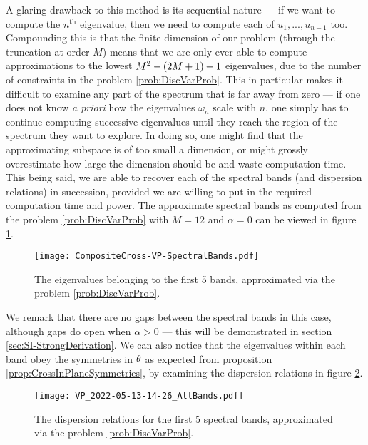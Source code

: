 A glaring drawback to this method is its sequential nature --- if we want to compute the $n^{\text{th}}$ eigenvalue, then we need to compute each of $u_1,...,u_{n-1}$ too.
Compounding this is that the finite dimension of our problem (through the truncation at order $M$) means that we are only ever able to compute approximations to the lowest $M^2 - \left( 2M + 1 \right) + 1$ eigenvalues, due to the number of constraints in the problem \ref{prob:DiscVarProb}.
This in particular makes it difficult to examine any part of the spectrum that is far away from zero --- if one does not know \emph{a priori} how the eigenvalues $\omega_n$ scale with $n$, one simply has to continue computing successive eigenvalues until they reach the region of the spectrum they want to explore.
In doing so, one might find that the approximating subspace is of too small a dimension, or might grossly overestimate how large the dimension should be and waste computation time.
This being said, we are able to recover each of the spectral bands (and dispersion relations) in succession, provided we are willing to put in the required computation time and power.
The approximate spectral bands as computed from the problem \ref{prob:DiscVarProb} with $M=12$ and $\alpha=0$ can be viewed in figure \ref{fig:CompositeCross-VP-SpectralBands}.
\begin{figure}[t!]
	\centering
	\texttt{[image: CompositeCross-VP-SpectralBands.pdf]}
	\caption[Eigenvalues of \eqref{eq:SI-WaveEqn}, computed via solution of problem \ref{prob:DiscVarProb}.]{\label{fig:CompositeCross-VP-SpectralBands} The eigenvalues belonging to the first 5 bands, approximated via the problem \ref{prob:DiscVarProb}.}
\end{figure}
We remark that there are no gaps between the spectral bands in this case, although gaps do open when $\alpha>0$ --- this will be demonstrated in section \ref{sec:SI-StrongDerivation}.
We can also notice that the eigenvalues within each band obey the symmetries in $\theta$ as expected from proposition \ref{prop:CrossInPlaneSymmetries}, by examining the dispersion relations in figure \ref{fig:VP_AllBands}.
\begin{figure}[t!]
	\centering
	\texttt{[image: VP\_2022-05-13-14-26\_AllBands.pdf]}
	\caption[Dispersion relations for the first 5 spectral bands of \eqref{eq:SI-WaveEqn}, computed via solution of problem \ref{prob:DiscVarProb}.]{\label{fig:VP_AllBands} The dispersion relations for the first 5 spectral bands, approximated via the problem \ref{prob:DiscVarProb}.}
\end{figure}

